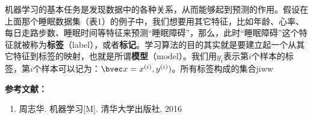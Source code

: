 机器学习的基本任务是发现数据中的各种关系，从而能够起到预测的作用。假设在上面那个睡眠数据集（表1）的例子中，我们想要用其它特征，比如年龄、心率、每日走路步数、睡眠时间等特征来预测“睡眠障碍”，那么，此时“睡眠障碍”这个特征就被称为\textbf{标签}（label），或者\textbf{标记}。学习算法的目的其实就是要建立起一个从其它特征到标签的映射，也就是所谓\textbf{模型}（model）。我们用$y_i$表示第$i$个样本的标签，第$i$个样本可以记为：$\bvec x=x^{(i)}, y^{(i)})$。所有标签构成的集合jiww


\textbf{参考文献：}
\begin{enumerate}
\item 周志华. 机器学习[M]. 清华大学出版社. 2016
\end{enumerate}